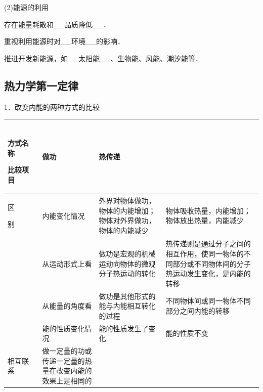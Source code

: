 (2)能源的利用

存在能量耗散和\_\_品质降低\_\_．

重视利用能源时对\_\_环境\_\_的影响．

推进开发新能源，如\_\_太阳能\_\_、生物能、风能、潮汐能等．
\subsection{热力学第一定律}

1．改变内能的两种方式的比较

\begin{longtable}[]{@{}llll@{}}
\toprule
\begin{minipage}[b]{0.22\columnwidth}\raggedright
　　　方式名称

比较项目 　　\strut
\end{minipage} & \begin{minipage}[b]{0.22\columnwidth}\raggedright
做功\strut
\end{minipage} & \begin{minipage}[b]{0.22\columnwidth}\raggedright
热传递\strut
\end{minipage} & \begin{minipage}[b]{0.22\columnwidth}\raggedright
\strut
\end{minipage}\tabularnewline
\midrule
\endhead
\begin{minipage}[t]{0.22\columnwidth}\raggedright
区

别\strut
\end{minipage} & \begin{minipage}[t]{0.22\columnwidth}\raggedright
内能变化情况\strut
\end{minipage} & \begin{minipage}[t]{0.22\columnwidth}\raggedright
外界对物体做功，物体的内能增加；物体对外界做功，物体的内能减少\strut
\end{minipage} & \begin{minipage}[t]{0.22\columnwidth}\raggedright
物体吸收热量，内能增加；物体放出热量，内能减少\strut
\end{minipage}\tabularnewline
& 从运动形式上看 & 做功是宏观的机械运动向物体的微观分子热运动的转化 &
热传递则是通过分子之间的相互作用，使同一物体的不同部分或不同物体间的分子热运动发生变化，是内能的转移\tabularnewline
& 从能量的角度看 & 做功是其他形式的能与内能相互转化的过程 &
不同物体间或同一物体不同部分之间内能的转移\tabularnewline
& 能的性质变化情况 & 能的性质发生了变化 & 能的性质不变\tabularnewline
相互联系 & 做一定量的功或传递一定量的热量在改变内能的效果上是相同的 &
&\tabularnewline
\bottomrule
\end{longtable}

